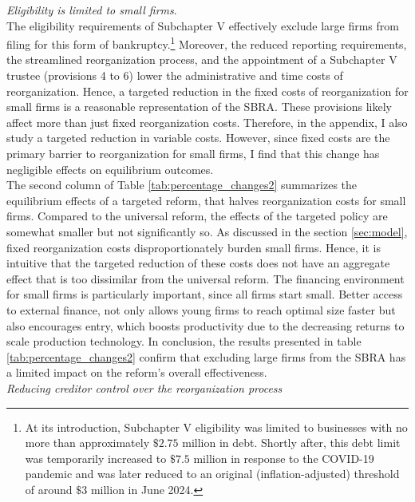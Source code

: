 \documentclass[12pt]{article}
\begin{document}
\noindent \textit{Eligibility is limited to small firms}. \\ 
The eligibility requirements of Subchapter V effectively exclude large firms from filing for this form of bankruptcy.\footnote{At its introduction, Subchapter V eligibility was limited to businesses with no more than approximately $\$2.75$ million in debt. Shortly after, this debt limit was temporarily increased to $\$7.5$ million in response to the COVID-19 pandemic and was later reduced to an original (inflation-adjusted) threshold of around $\$3$ million in June 2024.} Moreover, the reduced reporting requirements, the streamlined reorganization process, and the appointment of a Subchapter V trustee (provisions 4 to 6) lower the administrative and time costs of reorganization. Hence, a targeted reduction in the fixed costs of reorganization for small firms is a reasonable representation of the SBRA. These provisions likely affect more than just fixed reorganization costs. Therefore, in the appendix, I also study a targeted reduction in variable costs. However, since fixed costs are the primary barrier to reorganization for small firms, I find that this change has negligible effects on equilibrium outcomes.\vspace{3mm} \\
The second column of Table \ref{tab:percentage_changes2} summarizes the equilibrium effects of a targeted reform, that halves reorganization costs for small firms. Compared to the universal reform, the effects of the targeted policy are somewhat smaller but not significantly so. As discussed in the section \ref{sec:model}, fixed reorganization costs disproportionately burden small firms. Hence, it is intuitive that the targeted reduction of these costs does not have an aggregate effect that is too dissimilar from the universal reform. The financing environment for small firms is particularly important, since all firms start small. Better access to external finance, not only allows young firms to reach optimal size faster but also encourages entry, which boosts productivity due to the decreasing returns to scale production technology. In conclusion, the results presented in table \ref{tab:percentage_changes2} confirm that excluding large firms from the SBRA has a limited impact on the reform's overall effectiveness. \vspace{3mm} \\
\textit{Reducing creditor control over the reorganization process} \\
\end{document}
